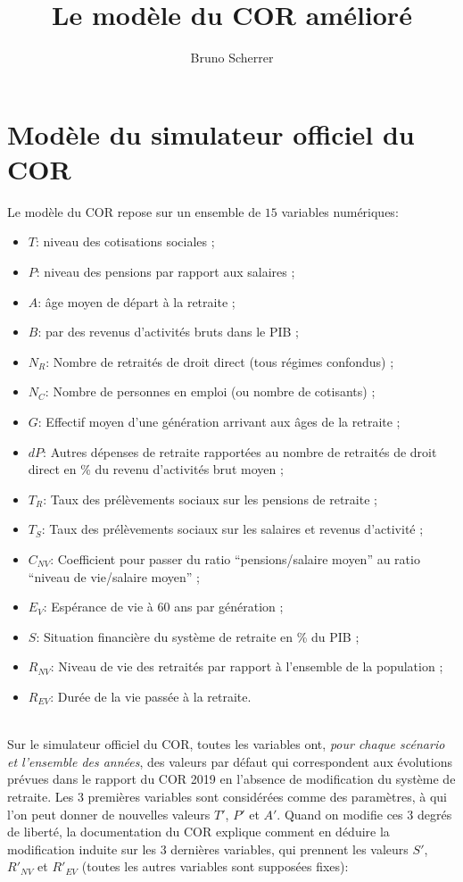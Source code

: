 \documentclass[10pt]{article}
\title{Le modèle du COR amélioré}
\author{Bruno Scherrer}
\begin{document}
\maketitle

\section{Modèle du simulateur officiel du COR}

  Le modèle du COR repose sur un ensemble de $15$ variables numériques:
  \begin{itemize}
  \item $T$: niveau des cotisations sociales ;
  \item $P$: niveau des pensions par rapport aux salaires ;
  \item $A$: âge moyen de départ à la retraite ;
  \item $B$: par des revenus d'activités bruts dans le PIB ;
  \item $N_R$: Nombre de retraités de droit direct (tous régimes confondus) ;
  \item $N_C$: Nombre de personnes en emploi (ou nombre de cotisants) ;
  \item $G$: Effectif moyen d'une génération arrivant aux âges de la retraite ;
  \item $dP$: Autres dépenses de retraite rapportées au nombre de retraités de droit direct en \% du revenu d'activités brut moyen ;
  \item $T_R$: Taux des prélèvements sociaux sur les pensions de retraite ;
  \item $T_S$: Taux des prélèvements sociaux sur les salaires et revenus d'activité ;
  \item $C_{NV}$: Coefficient pour passer du ratio ``pensions/salaire moyen'' au ratio ``niveau de vie/salaire moyen'' ;
  \item $E_V$: Espérance de vie à 60 ans par génération ;
  \item $S$: Situation financière du système de retraite en \% du PIB ;
  \item $R_{NV}$: Niveau de vie des retraités par rapport à l'ensemble de la population ;
    \item $R_{EV}$: Durée de la vie passée à la retraite.
  \end{itemize}

~\\
  
  Sur le simulateur officiel du COR, toutes les variables ont, \emph{pour chaque scénario et l'ensemble des années}, des valeurs par défaut qui correspondent aux évolutions prévues dans le rapport du COR 2019 en l'absence de modification du système de retraite. Les 3 premières variables sont considérées comme des paramètres, à qui l'on peut donner de nouvelles valeurs $T'$, $P'$ et $A'$. Quand on modifie ces 3 degrés de liberté, la documentation du COR explique comment en déduire la modification induite sur les 3 dernières variables, qui prennent les valeurs $S'$, $R'_{NV}$ et $R'_{EV}$ (toutes les autres variables sont supposées fixes):
\end{document}
